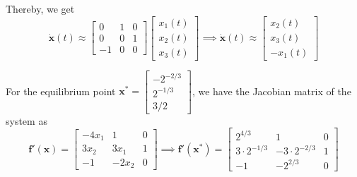 Thereby, we get
\[
    \mathbf{\dot x}(t) \approx
    \begin{bmatrix}
        0  & 1 & 0 \\
        0  & 0 & 1 \\
        -1 & 0 & 0
    \end{bmatrix}
    \begin{bmatrix}
        x_1(t) \\
        x_2(t) \\
        x_3(t)
    \end{bmatrix}
    \implies
    \boxed{
        \mathbf{\dot x}(t) \approx
        \begin{bmatrix}
            x_2(t) \\
            x_3(t) \\
            -x_1(t)
        \end{bmatrix}
    }
\]

For the equilibrium point \( \mathbf{x^*} = \begin{bmatrix} -2^{-2/3} \\ 2^{-1/3}  \\ 3/2 \end{bmatrix} \), we have the Jacobian matrix of the system as
\[
    \mathbf{f'}(\mathbf{x}) =
    \begin{bmatrix}
        -4x_1 & 1     & 0 \\
        3x_2  & 3x_1  & 1 \\
        -1    & -2x_2 & 0
    \end{bmatrix}
    \implies
    \mathbf{f'}(\mathbf{x^*}) =
    \begin{bmatrix}
        2^{4/3}         & 1                & 0 \\
        3\cdot 2^{-1/3} & -3\cdot 2^{-2/3} & 1 \\
        -1              & -2^{2/3}         & 0
    \end{bmatrix}
\]

